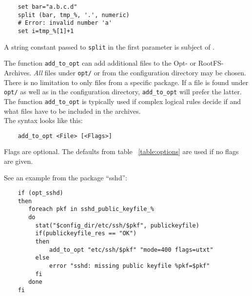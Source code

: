 \begin{example}
\begin{verbatim}
    set bar="a.b.c.d"
    split (bar, tmp_%, '.', numeric)
    # Error: invalid number 'a'
    set i=tmp_%[1]+1
\end{verbatim}
\end{example}

    A string constant passed to \texttt{split} in the first parameter is subject of
    .


    The function \texttt{add\_to\_opt} can add additional files to the
    Opt- or RootFS-Archives. \emph{All} files under \texttt{opt/} or from
    the configuration directory may be chosen. There is no limitation to only
    files from a specific package. If a file is found under \texttt{opt/} as
    well as in the configuration directory, \texttt{add\_to\_opt} will prefer
    the latter. The function \texttt{add\_to\_opt} is typically used if complex
    logical rules decide if and what files have to be included in the archives.\\

    The syntax looks like this:
\begin{example}
\begin{verbatim}
    add_to_opt <File> [<Flags>]
\end{verbatim}
\end{example}

    Flags are optional. The defaults from table ~\ref{table:options}
    are used if no flags are given.

    See an example from the package ``sshd'':

\begin{example}
\begin{verbatim}
    if (opt_sshd)
    then
       foreach pkf in sshd_public_keyfile_%
       do
         stat("$config_dir/etc/ssh/$pkf", publickeyfile)
         if(publickeyfile_res == "OK")
         then
             add_to_opt "etc/ssh/$pkf" "mode=400 flags=utxt"
         else
             error "sshd: missing public keyfile %pkf=$pkf"
         fi
       done
    fi
\end{verbatim}
\end{example}

